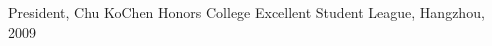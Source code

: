 \documentclass[margin,line]{res}
\newenvironment{list2}{
  \begin{list}{$\bullet$}{%
      \setlength{\itemsep}{0in}
      \setlength{\parsep}{0in} \setlength{\parskip}{0in}
      \setlength{\topsep}{0in} \setlength{\partopsep}{0in} 
      \setlength{\leftmargin}{0.2in}}}{\end{list}}
\begin{document}
\begin{resume}
President, Chu KoChen Honors College Excellent Student League, Hangzhou, 2009
%
%
%
%



\end{resume}
\end{document}

